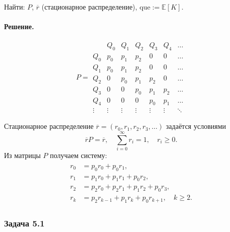 Найти: $P$, $\overline{r}$ (стационарное распределение), $\mathrm{que} := \mathbb E[K]$.

\paragraph{Решение.}

\[
	P =
	\begin{array}{c|cccccc}
		       & Q_0    & Q_1    & Q_2    & Q_3    & Q_4    & \ldots \\ \hline
		Q_0    & p_0    & p_1    & p_2    & 0      & 0      & \ldots \\
		Q_1    & p_0    & p_1    & p_2    & 0      & 0      & \ldots \\
		Q_2    & 0      & p_0    & p_1    & p_2    & 0      & \ldots \\
		Q_3    & 0      & 0      & p_0    & p_1    & p_2    & \ldots \\
		Q_4    & 0      & 0      & 0      & p_0    & p_1    & \ldots \\
		\vdots & \vdots & \vdots & \vdots & \vdots & \vdots & \ddots
	\end{array}
\]

Стационарное распределение $\overline r=(r_0,r_1,r_2,r_3,\ldots)$ задаётся условиями
\[
	\overline r P = \overline r,\quad \sum_{i=0}^\infty r_i = 1,\quad r_i\ge0.
\]
Из матрицы $P$ получаем систему:
\[
	\begin{array}{rcl}
		\begin{aligned}
			r_0 & = p_0 r_0 + p_0 r_1,                                 \\
			r_1 & = p_1 r_0 + p_1 r_1 + p_0 r_2,                       \\
			r_2 & = p_2 r_0 + p_2 r_1 + p_1 r_2 + p_0 r_3,             \\
			r_k & = p_2 r_{k-1} + p_1 r_k + p_0 r_{k+1}, \quad k\ge 2.
		\end{aligned}
	\end{array}
\]

\subsubsection*{Задача 5.1}

